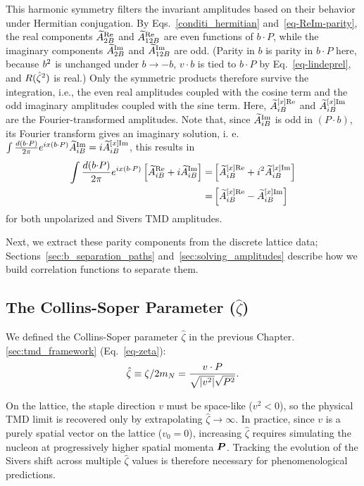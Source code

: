 This harmonic symmetry filters the invariant amplitudes based on their behavior under Hermitian conjugation. By Eqs.~\eqref{conditi_hermitian} and~\eqref{eq-ReIm-parity}, the real components $\widetilde{A}_{2B}^{\text{Re}}$ and $\widetilde{A}_{12B}^{\text{Re}}$ are even functions of $b \cdot P$, while the imaginary components $\widetilde{A}_{2B}^{\text{Im}}$ and $\widetilde{A}_{12B}^{\text{Im}}$ are odd. (Parity in $b$ is parity in $b\cdot P$ here, because $b^2$ is unchanged under $b\to-b$, $v\cdot b$ is tied to $b\cdot P$ by Eq.~\eqref{eq-lindeprel}, and $R({\hat \zeta}^2)$ is real.) Only the symmetric products therefore survive the integration, i.e., the even real amplitudes coupled with the cosine term and the odd imaginary amplitudes coupled with the sine term. Here, $\widetilde{A}_{iB}^{[x]\text{Re}}$ and $\widetilde{A}_{iB}^{[x]\text{Im}}$ are the Fourier-transformed amplitudes. Note that, since $\widetilde{A}_{iB}^{\text{Im}}$ is odd in $(P\cdot b)$, its Fourier transform gives an imaginary solution, i. e. $\int \frac{d(b {\cdot} P)}{2\pi}e^{ix(b\cdot P)}\widetilde{A}_{iB}^{\text{Im}}=i\widetilde{A}_{iB}^{[x]\text{Im}}$, this results in
\begin{align}
    \int \frac{d(b {\cdot} P)}{2\pi}e^{ix(b\cdot P)} \left[\widetilde{A}_{iB}^{\text{Re}}+i\widetilde{A}_{iB}^{\text{Im}}\right]=&\left[\widetilde{A}_{iB}^{[x]\text{Re}}+i^2\widetilde{A}_{iB}^{[x]\text{Im}}\right]\\
    =&\left[\widetilde{A}_{iB}^{[x]\text{Re}}-\widetilde{A}_{iB}^{[x]\text{Im}}\right]
    \label{reminusimag-amp}
\end{align}
for both unpolarized and Sivers TMD amplitudes. 

Next, we extract these parity components from the discrete lattice data; Sections~\ref{sec:b_separation_paths} and~\ref{sec:solving_amplitudes} describe how we build correlation functions to separate them.


\subsection{The Collins-Soper Parameter (\texorpdfstring{$\hat{\zeta}$}{zeta-hat})}
\label{sec:collins_soper_parameter}
We defined the Collins-Soper parameter $\hat{\zeta}$ in the previous Chapter. \ref{sec:tmd_framework} (Eq.~\eqref{eq-zeta}):
\begin{equation}
	\hat \zeta \equiv \zeta / 2 m_N =  \frac{v \cdot P}{\sqrt{|v^2|} \sqrt{P^2}}.
	\label{eq-zeta-again}
\end{equation}

On the lattice, the staple direction $v$ must be space-like ($v^2 < 0$), so the physical TMD limit is recovered only by extrapolating $\hat{\zeta} \to \infty$. In practice, since $v$ is a purely spatial vector on the lattice ($v_0 = 0$), increasing $\hat{\zeta}$ requires simulating the nucleon at progressively higher spatial momenta $\boldsymbol{P}$. Tracking the evolution of the Sivers shift across multiple $\hat{\zeta}$ values is therefore necessary for phenomenological predictions.

